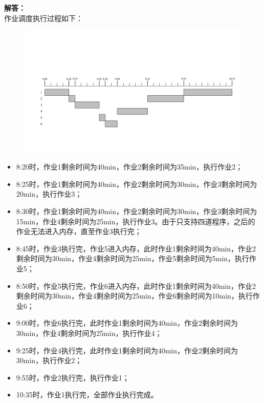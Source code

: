 \documentclass[10pt,a4paper,UTF8]{ctexart}
\newenvironment{solution}{\noindent\textbf{解答：}\\ \indent}{\par}
\begin{document}
\begin{solution}
	作业调度执行过程如下：
	\begin{figure}[H]
		\centering
		\vspace{-0.5em}
		\includegraphics[width=\linewidth]{img/5.pdf}
		\vspace{-1em}
	\end{figure}
	\begin{itemize}
		\item 8:20时，作业1剩余时间为40min，作业2剩余时间为35min，执行作业2；
		\item 8:25时，作业1剩余时间为40min，作业2剩余时间为30min，作业3剩余时间为20min，执行作业3；
		\item 8:30时，作业1剩余时间为40min，作业2剩余时间为30min，作业3剩余时间为15min，作业4剩余时间为25min，执行作业3。由于只支持四道程序，之后的作业无法进入内存，直至作业3执行完；
		\item 8:45时，作业3执行完，作业5进入内存，此时作业1剩余时间为40min，作业2剩余时间为30min，作业4剩余时间为25min，作业5剩余时间为5min，执行作业5；
		\item 8:50时，作业5执行完，作业6进入内存，此时作业1剩余时间为40min，作业2剩余时间为30min，作业4剩余时间为25min，作业6剩余时间为10min，执行作业6；
		\item 9:00时，作业6执行完，此时作业1剩余时间为40min，作业2剩余时间为30min，作业4剩余时间为25min，执行作业4；
		\item 9:25时，作业4执行完，此时作业1剩余时间为40min，作业2剩余时间为30min，执行作业2；
		\item 9:55时，作业2执行完，执行作业1；
		\item 10:35时，作业1执行完，全部作业执行完成。	
	\end{itemize}


\end{solution}
\end{document}
